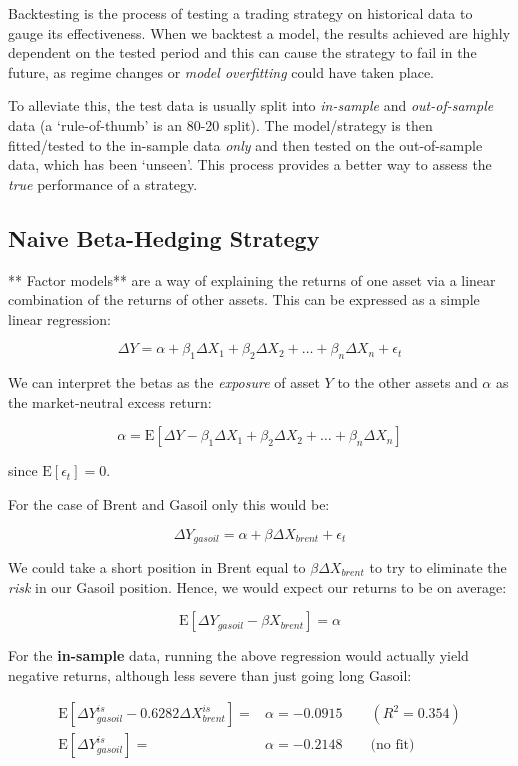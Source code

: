 \documentclass{article}
\begin{document}
Backtesting is the process of testing a trading strategy on historical
data to gauge its effectiveness. When we backtest a model, the results
achieved are highly dependent on the tested period and this can cause
the strategy to fail in the future, as regime changes or \emph{model
overfitting} could have taken place.

To alleviate this, the test data is usually split into \emph{in-sample}
and \emph{out-of-sample} data (a `rule-of-thumb' is an 80-20 split). The
model/strategy is then fitted/tested to the in-sample data \emph{only}
and then tested on the out-of-sample data, which has been `unseen'. This
process provides a better way to assess the \emph{true} performance of a
strategy.

    \subsection{Naive Beta-Hedging
Strategy}\label{naive-beta-hedging-strategy}

    ** Factor models** are a way of explaining the returns of one asset via
a linear combination of the returns of other assets. This can be
expressed as a simple linear regression:

\[\Delta Y = \alpha + \beta_1 \Delta X_1 + \beta_2 \Delta X_2 + \dots + \beta_n \Delta X_n + \epsilon_t \]

We can interpret the betas as the \emph{exposure} of asset \(Y\) to the
other assets and \(\alpha\) as the market-neutral excess return:

\[ \alpha = \mathrm{E}[\Delta Y - \beta_1 \Delta X_1 + \beta_2 \Delta X_2 + \dots + \beta_n \Delta X_n] \]

since \(\mathrm{E}[\epsilon_t] =0\).

For the case of Brent and Gasoil only this would be:

\[\Delta Y_{gasoil} = \alpha + \beta \Delta X_{brent} + \epsilon_t \]

We could take a short position in Brent equal to
\(\beta \Delta X_{brent}\) to try to eliminate the \emph{risk} in our
Gasoil position. Hence, we would expect our returns to be on average:

\[\mathrm{E} [\Delta Y_{gasoil} - \beta X_{brent}] = \alpha \]

For the \textbf{in-sample} data, running the above regression would
actually yield negative returns, although less severe than just going
long Gasoil:

\[
\begin{array}{rl}
\mathrm{E} [ \Delta Y_{gasoil}^{is}  -0.6282 \Delta X_{brent}^{is}] =  & \alpha   =  -0.0915 \qquad (R^2 = 0.354) \\
\mathrm{E} [ \Delta Y_{gasoil}^{is}]  =  & \alpha   =   
-0.2148  \qquad  \text{(no fit)}
\end{array}
\]
\end{document}
